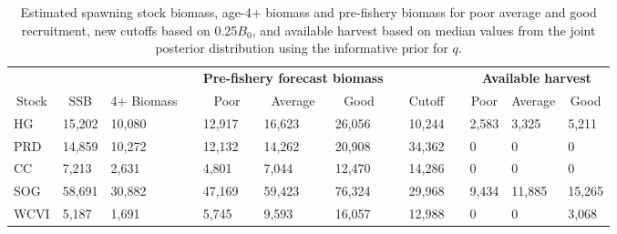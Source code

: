 %
\begin{table}[!tbp]
 \small
 \caption{Estimated spawning stock biomass,  age-4+ biomass and pre-fishery
			biomass for poor average and good recruitment, new cutoffs based on 0.25$B_0$,  and 
			available harvest based on median values from the joint posterior distribution using the informative prior for $q$.\label{TableCatchAdvice4}} 
 \begin{center}
 \begin{tabular}{lllclllclclll}\hline\hline
\multicolumn{3}{c}{\bfseries }&
\multicolumn{1}{c}{\bfseries }&
\multicolumn{3}{c}{\bfseries Pre-fishery forecast biomass}&
\multicolumn{1}{c}{\bfseries }&
\multicolumn{1}{c}{\bfseries }&
\multicolumn{1}{c}{\bfseries }&
\multicolumn{3}{c}{\bfseries Available harvest}
\tabularnewline \cline{1-13}
\multicolumn{1}{c}{Stock}&\multicolumn{1}{c}{SSB}&\multicolumn{1}{c}{4+ Biomass}&\multicolumn{1}{c}{}&\multicolumn{1}{c}{Poor}&\multicolumn{1}{c}{Average}&\multicolumn{1}{c}{Good}&\multicolumn{1}{c}{}&\multicolumn{1}{c}{Cutoff}&\multicolumn{1}{c}{}&\multicolumn{1}{c}{Poor}&\multicolumn{1}{c}{Average}&\multicolumn{1}{c}{Good}\tabularnewline
\hline
HG&15,202&10,080&&12,917&16,623&26,056&&10,244&& 2,583& 3,325& 5,211\tabularnewline
PRD&14,859&10,272&&12,132&14,262&20,908&&34,362&&     0&     0&     0\tabularnewline
CC& 7,213& 2,631&& 4,801& 7,044&12,470&&14,286&&     0&     0&     0\tabularnewline
SOG&58,691&30,882&&47,169&59,423&76,324&&29,968&& 9,434&11,885&15,265\tabularnewline
WCVI& 5,187& 1,691&& 5,745& 9,593&16,057&&12,988&&     0&     0& 3,068\tabularnewline
\hline
\end{tabular}

\end{center}

\end{table}

